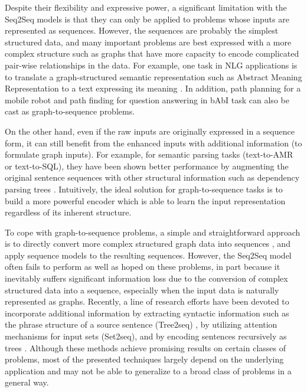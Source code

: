 \documentclass{article} \usepackage{iclr2019_conference,times}
\begin{document}
Despite their flexibility and expressive power, a significant limitation with the Seq2Seq models is that they can only be applied to problems whose inputs are represented as sequences. However, the sequences are probably the simplest structured data, and many important problems are best expressed with a more complex structure such as graphs that have more capacity to encode complicated pair-wise relationships in the data. For example, one task in NLG applications is to translate a graph-structured semantic representation such as Abstract Meaning Representation to a text expressing its meaning \citep{banarescu2013abstract}. In addition, path planning for a mobile robot \citep{hu2004knowledge} and path finding for question answering in bAbI task \citep{li2015gated} can also be cast as graph-to-sequence problems. 

On the other hand, even if the raw inputs are originally expressed in a sequence form, it can still benefit from the enhanced inputs with additional information (to formulate graph inputs). For example, for semantic parsing tasks (text-to-AMR or text-to-SQL), they have been shown better performance by augmenting the original sentence sequences with other structural information such as dependency parsing trees \citep{pust2015parsing}. 
Intuitively, the ideal solution for graph-to-sequence tasks is to build a more powerful encoder which is able to learn the input representation regardless of its inherent structure.


To cope with graph-to-sequence problems, a simple and straightforward approach is to directly convert more complex structured graph data into sequences \citep{iyer2016summarizing,gomez2016automatic,liu2017retrosynthetic}, and apply sequence models to the resulting sequences. However, the Seq2Seq model often fails to perform as well as hoped on these problems, in part because it inevitably suffers significant information loss due to the conversion of complex structured data into a sequence, especially when the input data is naturally represented as graphs. Recently, a line of research efforts have been devoted to incorporate additional information by extracting syntactic information such as the phrase structure of a source
sentence (Tree2seq) \citep{eriguchi2016tree}, by utilizing attention mechanisms for input sets (Set2seq)\citep{vinyals2015order}, and by encoding sentences recursively as trees \citep{socher2010learning,tai2015improved}. Although these methods achieve promising results on certain classes of problems, most of the presented techniques largely depend on the underlying application and may not be able to generalize to a broad class of problems in a general way. 
\end{document}
